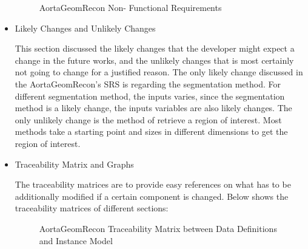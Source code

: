 \begin{itemize}
\begin{figure}[H]
    \centering
    \caption[AortaGeomRecon Non- Functional Requirements]{AortaGeomRecon Non- Functional Requirements}
    \label{fig_agr_nfr}
\end{figure}

\item Likely Changes and Unlikely Changes

This section discussed the likely changes that the developer might expect a change in the future works, and the unlikely changes that is most certainly not going to change for a justified reason. The only likely change discussed in the AortaGeomRecon's SRS is regarding the segmentation method. For different segmentation method, the inputs varies, since the segmentation method is a likely change, the inputs variables are also likely changes. The only unlikely change is the method of retrieve a region of interest. Most methods take a starting point and sizes in different dimensions to get the region of interest.

\item Traceability Matrix and Graphs

The traceability matrices are to provide easy references on what has to be additionally modified if a certain component is changed. Below shows the traceability matrices of different sections:
\begin{figure}[H]
    \centering
    \caption[AortaGeomRecon Traceability Matrix between Data Definitions and Instance Model]{AortaGeomRecon Traceability Matrix between Data Definitions and Instance Model}
    \label{fig_agr_tm_dd_im}
\end{figure}


\end{itemize}
